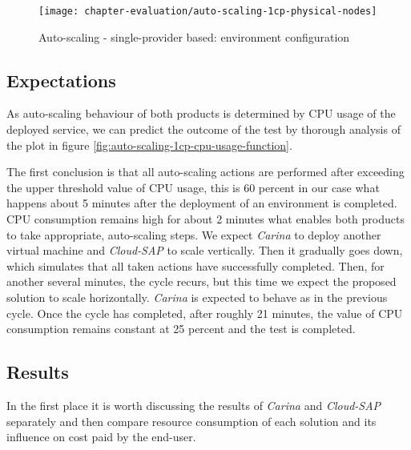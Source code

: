 \begin{figure}[!ht]
  \begin{center}
    \texttt{[image: chapter-evaluation/auto-scaling-1cp-physical-nodes]}
  \end{center}
  \caption{Auto-scaling - single-provider based: environment configuration}
  \label{fig:auto-scaling-1cp-physical-nodes}
\end{figure}


\subsection*{Expectations}
As auto-scaling behaviour of both products is determined by CPU usage of the deployed service, we can predict the outcome of the test by thorough analysis of the plot in figure \ref{fig:auto-scaling-1cp-cpu-usage-function}.

The first conclusion is that all auto-scaling actions are performed after exceeding the upper threshold value of CPU usage, this is 60 percent in our case what happens about 5 minutes after the deployment of an environment is completed. CPU consumption remains high for about 2 minutes what enables both products to take appropriate, auto-scaling steps. We expect \emph{Carina} to deploy another virtual machine and \emph{Cloud-SAP} to scale vertically. Then it gradually goes down, which simulates that all taken actions have successfully completed. Then, for another several minutes, the cycle recurs, but this time we expect the proposed solution to scale horizontally. \emph{Carina} is expected to behave as in the previous cycle. Once the cycle has completed, after roughly 21 minutes, the value of CPU consumption remains constant at 25 percent and the test is completed.
\subsection*{Results}
  In the first place it is worth discussing the results of \emph{Carina} and \emph{Cloud-SAP} separately and then compare resource consumption of each solution and its influence on cost paid by the end-user.

